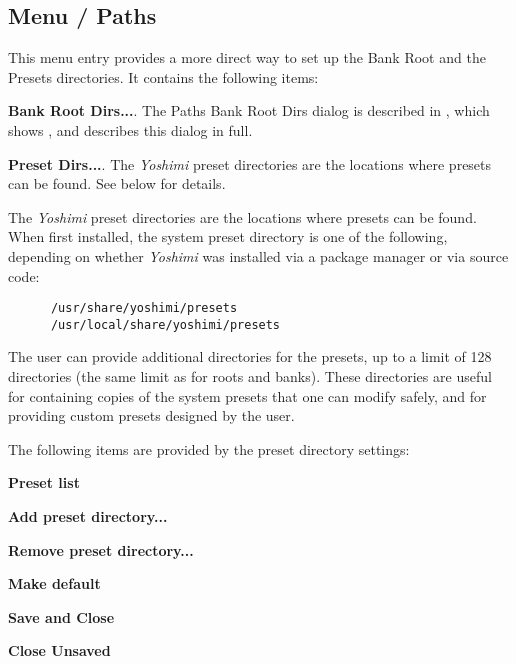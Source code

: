 



%

\subsection{Menu / Paths}
\label{subsec:menu_paths}

   This menu entry provides a more direct way to set up the Bank Root and
   the Presets directories.  It contains the following items:

   \begin{enumber}
      \item \textbf{Bank Root Dirs...}.
         The Paths Bank Root Dirs dialog is described in
         ,
         which shows
         , and describes this dialog in full.
      \item \textbf{Preset Dirs...}.
         The \textsl{Yoshimi} preset directories are the locations where
         presets can be found.  See below for details.
   \end{enumber}

   The \textsl{Yoshimi} preset directories are the locations where
   presets can be found.  When first installed, the system
   preset directory is one of the following, depending on whether
   \textsl{Yoshimi} was installed via a package manager or via source code:

   \begin{verbatim}
      /usr/share/yoshimi/presets
      /usr/local/share/yoshimi/presets
   \end{verbatim}

   The user can provide additional directories for the presets, up to a limit
   of 128 directories (the same limit as for roots and banks).
   These directories are useful for containing copies of the system
   presets that one can modify safely, and for providing custom
   presets designed by the user.

   The following items are provided by the preset directory settings:

   \begin{enumber}
      \item \textbf{Preset list}
      \item \textbf{Add preset directory...}
      \item \textbf{Remove preset directory...}
      \item \textbf{Make default}
      \item \textbf{Save and Close}
      \item \textbf{Close Unsaved}
   \end{enumber}

